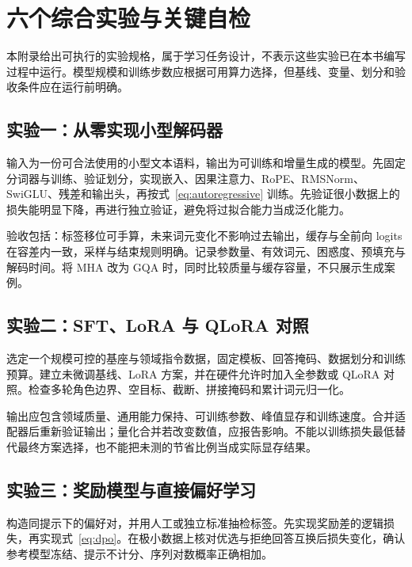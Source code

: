 \setcounter{chapter}{1} %
\chapter{六个综合实验与关键自检}
\label{app:experiments}

本附录给出可执行的实验规格，属于学习任务设计，不表示这些实验已在本书编写过程中运行。模型规模和训练步数应根据可用算力选择，但基线、变量、划分和验收条件应在运行前明确。

\section{实验一：从零实现小型解码器}

输入为一份可合法使用的小型文本语料，输出为可训练和增量生成的模型。先固定分词器与训练、验证划分，实现嵌入、因果注意力、RoPE、RMSNorm、SwiGLU、残差和输出头，再按式~\eqref{eq:autoregressive} 训练。先验证很小数据上的损失能明显下降，再进行独立验证，避免将过拟合能力当成泛化能力。

验收包括：标签移位可手算，未来词元变化不影响过去输出，缓存与全前向 logits 在容差内一致，采样与结束规则明确。记录参数量、有效词元、困惑度、预填充与解码时间。将 MHA 改为 GQA 时，同时比较质量与缓存容量，不只展示生成案例。

\section{实验二：SFT、LoRA 与 QLoRA 对照}

选定一个规模可控的基座与领域指令数据，固定模板、回答掩码、数据划分和训练预算。建立未微调基线、LoRA 方案，并在硬件允许时加入全参数或 QLoRA 对照。检查多轮角色边界、空目标、截断、拼接掩码和累计词元归一化。

输出应包含领域质量、通用能力保持、可训练参数、峰值显存和训练速度。合并适配器后重新验证输出；量化合并若改变数值，应报告影响。不能以训练损失最低替代最终方案选择，也不能把未测的节省比例当成实际显存结果。

\section{实验三：奖励模型与直接偏好学习}

构造同提示下的偏好对，并用人工或独立标准抽检标签。先实现奖励差的逻辑损失，再实现式~\eqref{eq:dpo}。在极小数据上核对优选与拒绝回答互换后损失变化，确认参考模型冻结、提示不计分、序列对数概率正确相加。

